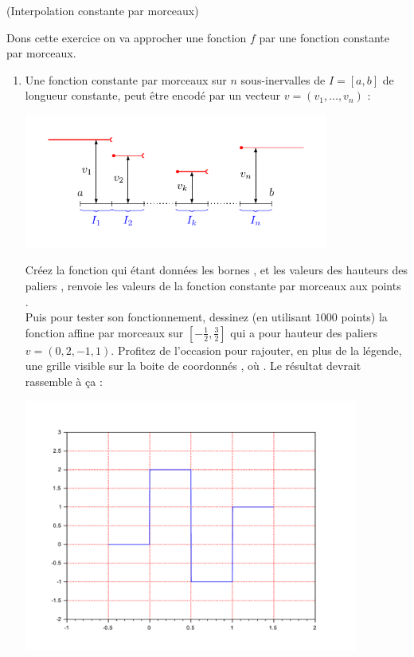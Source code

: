 \documentclass[a4paper,12pt,reqno]{amsart}
\begin{document}
\begin{exo} (Interpolation constante par morceaux)

  Dons cette exercice on va approcher une fonction $f$ par une fonction constante par morceaux.
  \begin{enumerate}
    \item Une fonction constante par morceaux sur $n$ sous-inervalles de $I=[a,b]$ de longueur constante, peut être encodé par un vecteur $v=(v_{1},\ldots,v_{n})$ :
    \begin{center}
      \includegraphics[width=10cm]{ConstParMorceaux}
    \end{center}
    Créez la fonction  qui étant données les bornes ,  et les valeurs des hauteurs des paliers , renvoie les valeurs  de la fonction constante par morceaux aux points .\\
    Puis pour tester son fonctionnement, dessinez (en utilisant $1000$ points) la fonction affine par morceaux sur $[-\frac12, \frac32]$ qui a pour hauteur des paliers $v=(0,2,-1,1)$. Profitez de l'occasion pour rajouter, en plus de la légende, une grille  visible sur la boite de coordonnés , où . Le résultat devrait rassemble à ça :
    \begin{center}
      \includegraphics[width=11cm]{SciLab_test_constante}
    \end{center}


\end{enumerate}
\end{exo}
\end{document}
